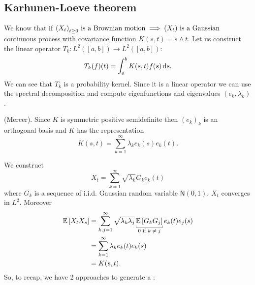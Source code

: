 \documentclass[12pt]{report}
\begin{document}
\subsection{Karhunen-Loeve theorem}
We know that if 
	${(X_{t})}_{t\geq0}\text{ is a Brownian motion}\implies(X_{t})\text{ is a Gaussian}$ continuous process with covariance function $K(s,t)=s\wedge t$. Let us construct the linear operator $T_{k}:L^{2}([a,b])\to L^{2}([a,b])$:
	\begin{equation*}
		T_{k}(f)(t)=\int_{a}^{b}K(s,t)f(s)\mathop{}\!\mathrm{d} s.
	\end{equation*} 
	We can see that $T_{k}$ is a probability kernel. Since it is a linear operator we can use the spectral decomposition and compute eigenfunctions and eigenvalues $(e_{k},\lambda_{k})$.
\begin{theorem}
	(Mercer). Since $K$ is symmetric positive semidefinite then ${(e_{k})}_{k}$ is an orthogonal basis and $K$ has the representation
	\begin{equation*}
		K(s,t)=\sum_{k=1}^{\infty}\lambda_{k}e_{k}(s)e_{k}(t).
	\end{equation*}
\end{theorem}
We construct 
\begin{equation*}
	X_{t}=\sum_{k=1}^{\infty}\sqrt{\lambda_{k}}G_{k}e_{k}(t)
\end{equation*}
where $G_{k}$ is a sequence of i.i.d. Gaussian random variable $\mathsf{N}(0,1)$. $X_{t}$ converges in $L^{2}$. Moreover
\begin{align*}
	\ev{X_{t}X_{s}}&=\sum_{k,j=1}^{\infty}\sqrt{\lambda_{k}\lambda_{j}}\ubracketthin{\ev{G_{k}G_{j}}}_{\claptext{0 if $k\neq j$}}e_{k}(t)e_{j}(s)\\
	&=\sum_{k=1}^{\infty}\lambda_{k}e_{k}(t)e_{k}(s)\\
	&=K(s,t).
\end{align*}
So, to recap, we have 2 approaches to generate a \bwm:
\end{document}
